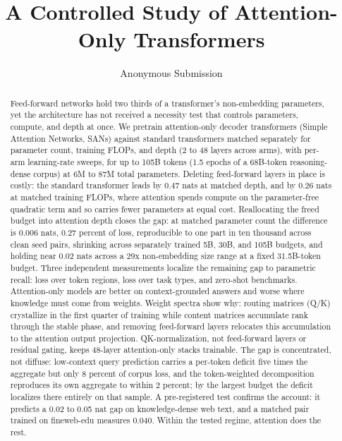 \documentclass[letterpaper]{article} %
\title{A Controlled Study of Attention-Only Transformers}
\author{
    Anonymous Submission
}
\begin{document}
\maketitle

\begin{abstract}
Feed-forward networks hold two thirds of a transformer's non-embedding
parameters, yet the architecture has not received a necessity test that
controls parameters, compute, and depth at once. We pretrain attention-only
decoder transformers (Simple Attention Networks, SANs) against standard
transformers matched separately for parameter count, training FLOPs, and
depth (2 to 48 layers across arms), with per-arm learning-rate sweeps, for
up to 105B tokens (1.5 epochs of a 68B-token reasoning-dense corpus) at 6M
to 87M total parameters. Deleting feed-forward layers in place is costly: the
standard transformer leads by 0.47 nats at matched depth, and by 0.26 nats
at matched training FLOPs, where attention spends compute on the
parameter-free quadratic term and so carries fewer parameters at equal
cost. Reallocating the freed budget into attention depth closes the gap:
at matched parameter count the difference is 0.006 nats, 0.27 percent of
loss, reproducible to one part in ten thousand across clean seed pairs,
shrinking across separately trained 5B, 30B, and 105B budgets, and holding
near 0.02 nats across a 29x non-embedding size range at a fixed
31.5B-token budget. Three independent
measurements localize the remaining gap to parametric recall: loss over
token regions, loss over task types, and zero-shot benchmarks.
Attention-only models are better on context-grounded answers and worse
where knowledge must come from weights. Weight spectra show why: routing
matrices (Q/K) crystallize in the first quarter of training while content
matrices accumulate rank through the stable phase, and removing
feed-forward layers relocates this accumulation to the attention output
projection.
QK-normalization, not feed-forward layers or residual gating, keeps
48-layer attention-only stacks trainable. The gap is concentrated, not
diffuse: low-context query prediction carries a per-token deficit five
times the aggregate but only 8 percent of corpus loss, and the
token-weighted decomposition reproduces its own aggregate to within 2
percent; by the largest budget the deficit localizes there entirely on
that sample. A
pre-registered test confirms the account: it predicts a 0.02 to 0.05 nat
gap on knowledge-dense web text, and a matched pair trained on fineweb-edu
measures 0.040. Within the tested regime, attention does the rest.
\end{abstract}
\end{document}

